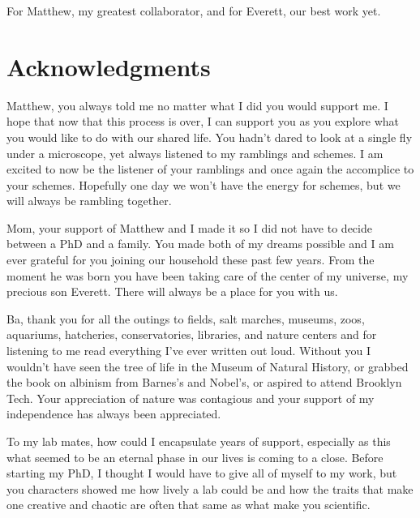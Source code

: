 \documentclass[12pt,reqno,oneside]{report}
\begin{document}
\newpage
\vspace*{2in}
\begin{center}
For Matthew, my greatest collaborator, and for Everett, our best work
yet. 
\end{center}
\vspace*{\fill}

\newpage
\thispagestyle{plain}
\chapter*{Acknowledgments}
\raggedright
\singlespacing
\setlength{\parindent}{24pt} 

Matthew, you always told me no matter what I did you would support me. I hope that now that this process is over, I can support you as you explore what you would like to do with our shared life. You hadn't dared to look at a single fly under a microscope, yet always listened to my ramblings and schemes. I am excited to now be the listener of your ramblings and once again the accomplice to your schemes. Hopefully one day we won't have the energy for schemes, but we will always be rambling together.

Mom, your support of Matthew and I made it so I did not have to decide between a PhD and a family. You made both of my dreams possible and I am ever grateful for you joining our household these past few years. From the moment he was born you have been taking care of the center of my universe, my precious son Everett. There will always be a place for you with us.

Ba, thank you for all the outings to fields, salt marches, museums, zoos, aquariums, hatcheries, conservatories, libraries, and nature centers and for listening to me read everything I've ever written out loud. Without you I wouldn't have seen the tree of life in the Museum of Natural History, or grabbed the book on albinism from Barnes's and Nobel's, or aspired to attend Brooklyn Tech. Your appreciation of nature was contagious and your support of my independence has always been appreciated.

To my lab mates, how could I encapsulate years of support, especially as this what seemed to be an eternal phase in our lives is coming to a close. Before starting my PhD, I thought I would have to give all of myself to my work, but you characters showed me how lively a lab could be and how the traits that make one creative and chaotic are often that same as what make you scientific.
\end{document}
